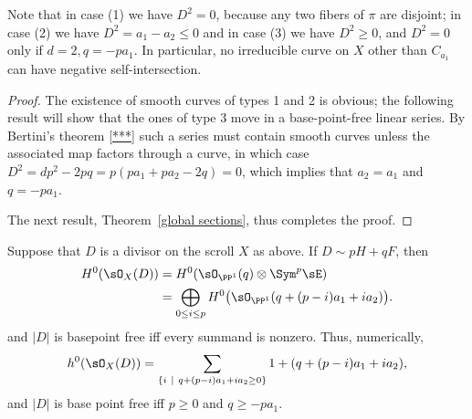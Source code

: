 Note that in case (1) we have $D^{2} = 0$, because any two fibers of $\pi$ are disjoint; in case (2) we have $D^{2}= a_{1}-a_{2}\leq 0$ and in case (3) we have $D^{2}\geq 0$, and $D^2=0$ only if
$d=2, q = -pa_1$. In particular, no irreducible curve
on $X$ other than $C_{a_1}$ can have negative self-intersection.

\begin{proof}
The existence of smooth curves of types 1 and 2 is obvious; the following result will show that
the ones of type 3 move in a base-point-free linear series. By Bertini's theorem \ref{***} such a series must contain smooth curves unless the associated map factors through a curve, in which case $D^2 = dp^2-2pq = p(pa_1+pa_2 -2 q) = 0$, which implies that $a_2=a_1$ and $q= -pa_1$.

The next result, Theorem~\ref{global sections}, thus completes the proof.
\end{proof}

\begin{theorem}\label{global sections}
Suppose that $D$ is a divisor on the scroll $X$ as above. If $D \sim pH+qF$, then 
\begin{align*}
 H^{0}(\sO_{X}(D)) &= H^{0}(\sO_{\PP^{1}}(q) \otimes \Sym^{p} \sE)\\
 &= 
\bigoplus_{0\leq i\leq p}H^{0}\bigl(\sO_{\PP^{1}}(q + (p-i)a_{1}+i a_{2})\bigr).
\end{align*}
and $|D|$ is basepoint free iff every summand is nonzero.
Thus, numerically,
$$
h^{0}(\sO_{X}(D)) = 
\sum_{\{i\ \mid\ q+(p-i)a_{1}+i a_{2} \geq 0\}}1+(q + (p-i)a_{1}+i a_{2}),
$$
and
$|D|$ is base point free iff $p\geq 0$ and $q\geq -pa_{1}$.
\end{theorem}

